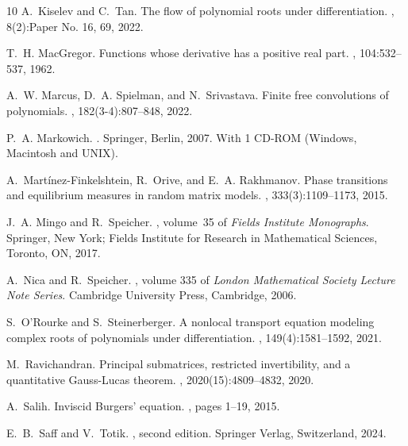 \documentclass[reqno,11pt]{amsart}
\theoremstyle{plain}
\theoremstyle{definition}
\theoremstyle{remark}
\numberwithin{equation}{section}
\numberwithin{equation}{section}
\begin{document}
\begin{thebibliography}{10}
	A.~Kiselev and C.~Tan.
	\newblock The flow of polynomial roots under differentiation.
	, 8(2):Paper No. 16, 69, 2022.
	
	T.~H. MacGregor.
	\newblock Functions whose derivative has a positive real part.
	, 104:532--537, 1962.
	
	A.~W. Marcus, D.~A. Spielman, and N.~Srivastava.
	\newblock Finite free convolutions of polynomials.
	, 182(3-4):807--848, 2022.
	
	P.~A. Markowich.
	.
	\newblock Springer, Berlin, 2007.
	\newblock With 1 CD-ROM (Windows, Macintosh and UNIX).
	
	A.~Mart\'{i}nez-Finkelshtein, R.~Orive, and E.~A. Rakhmanov.
	\newblock Phase transitions and equilibrium measures in random matrix models.
	, 333(3):1109--1173, 2015.
	
	J.~A. Mingo and R.~Speicher.
	, volume~35 of {\em Fields
		Institute Monographs}.
	\newblock Springer, New York; Fields Institute for Research in Mathematical
	Sciences, Toronto, ON, 2017.
	
	A.~Nica and R.~Speicher.
	, volume 335
	of {\em London Mathematical Society Lecture Note Series}.
	\newblock Cambridge University Press, Cambridge, 2006.
	
	S.~O'Rourke and S.~Steinerberger.
	\newblock A nonlocal transport equation modeling complex roots of polynomials
	under differentiation.
	, 149(4):1581--1592, 2021.
	
	M.~Ravichandran.
	\newblock Principal submatrices, restricted invertibility, and a quantitative
	{G}auss-{L}ucas theorem.
	, 2020(15):4809--4832, 2020.
	
	A.~Salih.
	\newblock Inviscid {Burgers'} equation.
	, pages 1--19, 2015.
		
	E.~B.~Saff and V.~Totik.
	, second edition.
	\newblock Springer Verlag, Switzerland, 2024.
	

\end{thebibliography}
\end{document}
